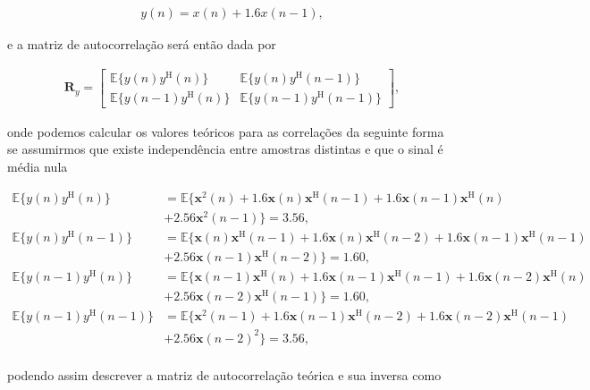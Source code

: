 \documentclass[a4paper,10pt]{article}
\begin{document}
\begin{enumerate}
\begin{enumerate}
						\begin{align}
							y(n) = x(n) + 1.6 x(n - 1),
						\end{align}
						
						e a matriz de autocorrelação será então dada por
						
						\begin{align}
							\mathbf{R}_{y} =
							\begin{bmatrix}
								\mathbb{E}\{y(n)y^{\text{H}}(n)\} & \mathbb{E}\{y(n)y^{\text{H}}(n - 1)\} \\
								\mathbb{E}\{y(n - 1)y^{\text{H}}(n)\} & \mathbb{E}\{y(n - 1)y^{\text{H}}(n - 1)\}
							\end{bmatrix},
						\end{align}
						
						onde podemos calcular os valores teóricos para as correlações da seguinte forma se assumirmos que existe independência entre amostras distintas e que o sinal é média nula 
						
						\begin{align*}
							\mathbb{E}\{y(n)y^{\text{H}}(n)\} &= \mathbb{E}\{ \mathbf{x}^{2}(n) + 1.6 \mathbf{x}(n) \mathbf{x}^{\text{H}}(n - 1) + 1.6 \mathbf{x}(n - 1) \mathbf{x}^{\text{H}} (n) \\
							&+ 2.56 \mathbf{x}^{2}(n - 1) \} = 3.56, \\
							\mathbb{E}\{y(n)y^{\text{H}}(n - 1)\} &= \mathbb{E}\{ \mathbf{x}(n) \mathbf{x}^{\text{H}}(n - 1) + 1.6 \mathbf{x}(n) \mathbf{x}^{\text{H}}(n - 2) + 1.6 \mathbf{x}(n - 1) \mathbf{x}^{\text{H}} (n - 1) \\ 
							&+ 2.56 \mathbf{x}(n - 1) \mathbf{x}^{\text{H}}(n - 2) \} = 1.60, \\
							\mathbb{E}\{y(n - 1)y^{\text{H}}(n)\} &= \mathbb{E}\{ \mathbf{x}(n - 1) \mathbf{x}^{\text{H}}(n) + 1.6 \mathbf{x}(n - 1) \mathbf{x}^{\text{H}}(n - 1) + 1.6 \mathbf{x}(n - 2) \mathbf{x}^{\text{H}} (n) \\ 
							&+ 2.56 \mathbf{x}(n - 2) \mathbf{x}^{\text{H}}(n - 1) \} = 1.60, \\
							\mathbb{E}\{y(n - 1)y^{\text{H}}(n - 1)\} &= \mathbb{E}\{ \mathbf{x}^{2}(n - 1) + 1.6 \mathbf{x}(n - 1) \mathbf{x}^{\text{H}}(n - 2) + 1.6 \mathbf{x}(n - 2) \mathbf{x}^{\text{H}} (n - 1) \\ 
							&+ 2.56 \mathbf{x}(n - 2)^{2} \} = 3.56, \\
						\end{align*}
						
						podendo assim descrever a matriz de autocorrelação teórica e sua inversa como
						

\end{enumerate}
\end{enumerate}
\end{document}
